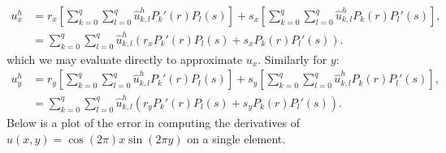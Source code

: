 \documentclass{article}
\begin{document}
  \begin{align*}
    u_x^h & = r_x \left[ \sum_{k = 0}^q \sum_{l = 0}^q \hat{u}_{k,l}^h P_k'(r)P_l(s) \right] + s_x \left[ \sum_{k = 0}^q \sum_{l = 0}^q \hat{u}_{k,l}^h P_k(r)P_l'(s) \right], \\
    & = \sum_{k = 0}^q \sum_{l = 0}^q \hat{u}_{k,l}^h \left( r_x P_k'(r)P_l(s) + s_x P_k(r)P_l'(s) \right).
  \end{align*}
which we may evaluate directly to approximate $u_x$. Similarly for $y$:
  \begin{align*}
    u_y^h & = r_y \left[ \sum_{k = 0}^q \sum_{l = 0}^q \hat{u}_{k,l}^h P_k'(r)P_l(s) \right] + s_y \left[ \sum_{k = 0}^q \sum_{l = 0}^q \hat{u}_{k,l}^h P_k(r)P_l'(s) \right], \\
    & = \sum_{k = 0}^q \sum_{l = 0}^q \hat{u}_{k,l}^h \left( r_y P_k'(r)P_l(s) + s_y P_k(r)P_l'(s) \right).
  \end{align*}
Below is a plot of the error in computing the derivatives of $u(x,y) = \cos \left(2\pi\right) x \sin \left(2\pi y\right)$ on a single element.
\end{document}
